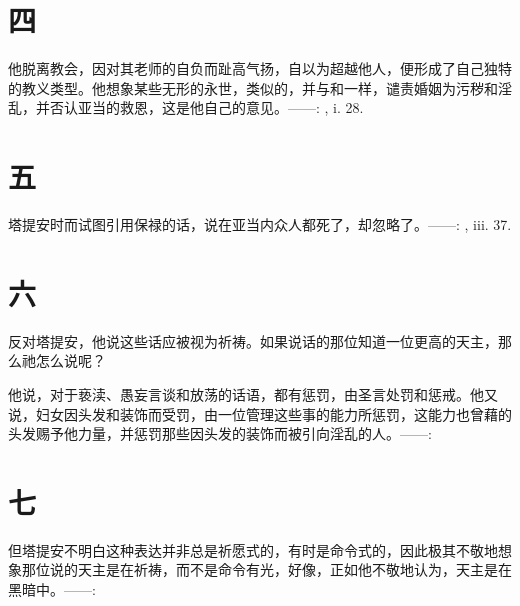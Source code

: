 
\section{四}

他脱离教会，因对其老师的自负而趾高气扬，自以为超越他人，便形成了自己独特的教义类型。他想象某些无形的永世，类似的，并与和一样，谴责婚姻为污秽和淫乱，并否认亚当的救恩，这是他自己的意见。——: , i. 28.\par


\section{五}

塔提安时而试图引用保禄的话，说在亚当内众人都死了，却忽略了。——: , iii. 37.\par


\section{六}

反对塔提安，他说这些话应被视为祈祷。如果说话的那位知道一位更高的天主，那么祂怎么说呢？\par

他说，对于亵渎、愚妄言谈和放荡的话语，都有惩罚，由圣言处罚和惩戒。他又说，妇女因头发和装饰而受罚，由一位管理这些事的能力所惩罚，这能力也曾藉的头发赐予他力量，并惩罚那些因头发的装饰而被引向淫乱的人。——: \par


\section{七}

但塔提安不明白这种表达并非总是祈愿式的，有时是命令式的，因此极其不敬地想象那位说的天主是在祈祷，而不是命令有光，好像，正如他不敬地认为，天主是在黑暗中。——: \par

